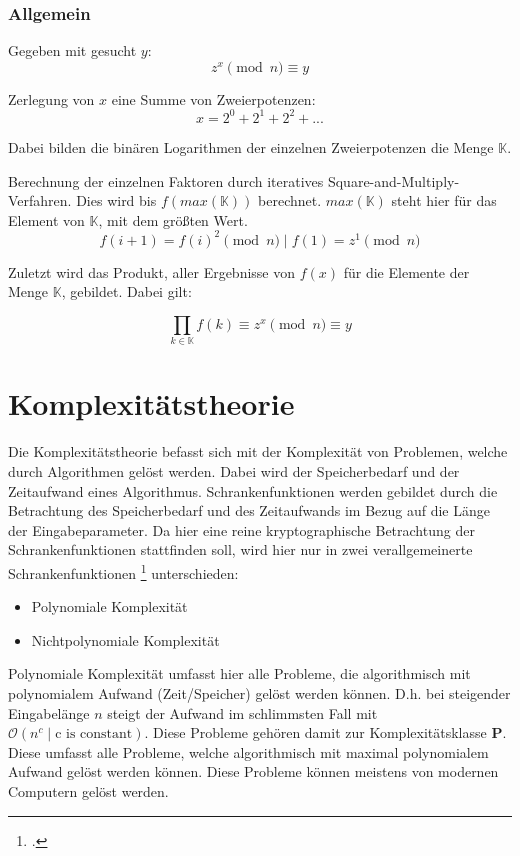         \subsubsection{Allgemein}
        Gegeben mit gesucht $y$:
        \begin{equation}
            z^{x} \pmod n \equiv y
        \end{equation}

        Zerlegung von $x$ eine Summe von Zweierpotenzen:
        \begin{equation}
            x = 2^{0} + 2^{1} + 2^{2} + ...
        \end{equation}

        Dabei bilden die binären Logarithmen der einzelnen Zweierpotenzen die Menge $\mathbb{K}$.

        Berechnung der einzelnen Faktoren durch iteratives Square-and-Multiply-Verfahren. Dies wird bis $f(max(\mathbb{K}))$ berechnet. $max(\mathbb{K})$ steht hier für das Element von $\mathbb{K}$, mit dem größten Wert.
        \begin{equation}
            f(i+1) = f(i)^{2} \pmod n \mid f(1) = z^{1} \pmod n 
        \end{equation}

        Zuletzt wird das Produkt, aller Ergebnisse von $f(x)$ für die Elemente der Menge $\mathbb{K}$, gebildet. Dabei gilt:

        \begin{equation}
            \prod_{k \in \mathbb{K}} f(k) \equiv z^{x} \pmod n \equiv y
        \end{equation}

\section{Komplexitätstheorie}
    Die Komplexitätstheorie befasst sich mit der Komplexität von Problemen, welche durch Algorithmen gelöst werden. Dabei wird der Speicherbedarf und der Zeitaufwand eines Algorithmus. Schrankenfunktionen werden gebildet durch die Betrachtung des Speicherbedarf und des Zeitaufwands im Bezug auf die Länge der Eingabeparameter. Da hier eine reine kryptographische Betrachtung der Schrankenfunktionen stattfinden soll, wird hier nur in zwei verallgemeinerte Schrankenfunktionen \footcite[178]{BSW.2015} unterschieden:
    \begin{itemize}
        \item Polynomiale Komplexität
        \item Nichtpolynomiale Komplexität
    \end{itemize}
    Polynomiale Komplexität umfasst hier alle Probleme, die algorithmisch mit polynomialem Aufwand (Zeit/Speicher) gelöst werden können. D.h. bei steigender Eingabelänge $n$ steigt der Aufwand im schlimmsten Fall mit $\mathcal{O}(n^{c} \mid \text{c is constant})$.
    Diese Probleme gehören damit zur Komplexitätsklasse \textbf{P}. Diese umfasst alle Probleme, welche algorithmisch mit maximal polynomialem Aufwand gelöst werden können. Diese Probleme können meistens von modernen Computern gelöst werden.

